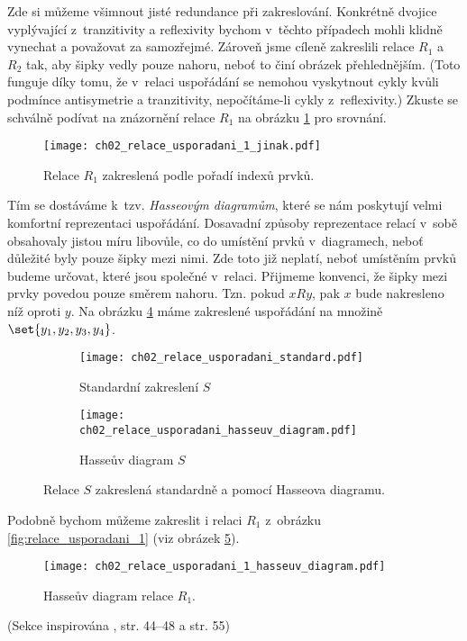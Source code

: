 Zde si můžeme všimnout jisté redundance při zakreslování. Konkrétně dvojice vyplývající z~tranzitivity a reflexivity bychom v~těchto případech mohli klidně vynechat a považovat za samozřejmé. Zároveň jsme cíleně zakreslili relace $R_1$ a $R_2$ tak, aby šipky vedly pouze nahoru, neboť to činí obrázek přehlednějším. (Toto funguje díky tomu, že v~relaci uspořádání se nemohou vyskytnout cykly kvůli podmínce antisymetrie a tranzitivity, nepočítáme-li cykly z~reflexivity.) Zkuste se schválně podívat na znázornění relace $R_1$ na obrázku \ref{fig:relace_usporadani_1_jinak} pro srovnání.
\begin{figure}[H]
    \centering
    \texttt{[image: ch02\_relace\_usporadani\_1\_jinak.pdf]}
    \caption{Relace $R_1$ zakreslená podle pořadí indexů prvků.}
    \label{fig:relace_usporadani_1_jinak}
\end{figure}
Tím se dostáváme k~tzv. \emph{Hasseovým diagramům}, které se nám poskytují velmi komfortní reprezentaci uspořádání. Dosavadní způsoby reprezentace relací v~sobě obsahovaly jistou míru libovůle, co do umístění prvků v~diagramech, neboť důležité byly pouze šipky mezi nimi. Zde toto již neplatí, neboť umístěním prvků budeme určovat, které jsou společné v~relaci. Přijmeme konvenci, že šipky mezi prvky povedou pouze směrem nahoru. Tzn. pokud $xRy$, pak $x$ bude nakresleno níž oproti $y$. Na obrázku \ref{fig:relace_usporadani_zakresleni} máme zakreslené uspořádání na množině $\set{y_1,y_2,y_3,y_4}$.
\begin{figure}[H]
    \centering
    \begin{subfigure}{6cm}
        \centering
        \texttt{[image: ch02\_relace\_usporadani\_standard.pdf]}
        \caption{Standardní zakreslení $S$}
        \label{subfig:relace_usporadani_standard}
    \end{subfigure}
    \qquad
    \begin{subfigure}{6cm}
        \centering
        \texttt{[image: ch02\_relace\_usporadani\_hasseuv\_diagram.pdf]}
        \caption{Hasseův diagram $S$}
        \label{subfig:relace_usporadani_hasseuv_diagram}
    \end{subfigure}
    \caption{Relace $S$ zakreslená standardně a pomocí Hasseova diagramu.}
    \label{fig:relace_usporadani_zakresleni}
\end{figure}
Podobně bychom můžeme zakreslit i relaci $R_1$ z~obrázku \ref{fig:relace_usporadani_1} (viz obrázek \ref{fig:relace_usporadani_1_hasseuv_diagram}).
\begin{figure}[H]
    \centering
    \texttt{[image: ch02\_relace\_usporadani\_1\_hasseuv\_diagram.pdf]}
    \caption{Hasseův diagram relace $R_1$.}
    \label{fig:relace_usporadani_1_hasseuv_diagram}
\end{figure}
(Sekce inspirována \cite{MatousekNesetril2009}, str. 44--48 a str. 55)